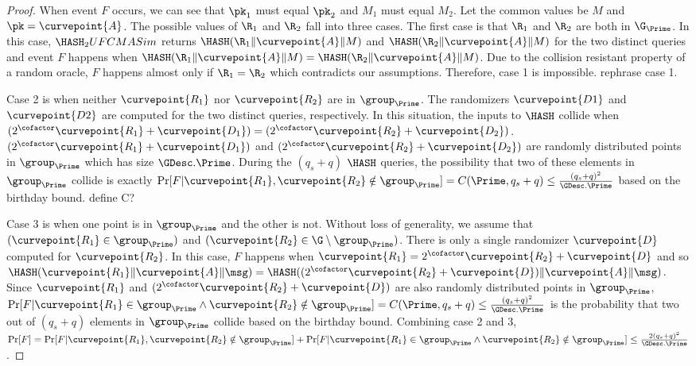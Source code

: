 \begin{proof}
	When event $F$ occurs, we can see that $\pk_1$ must equal $\pk_2$ and $M_1$ must equal $M_2$. Let the common values be $M$ and $\pk=\curvepoint{A}$. The possible values of $\R_1$ and $\R_2$ fall into three cases. The first case is that $\R_1$ and $\R_2$ are both in $\G_\Prime$. In this case, $\HASH_2UFCMASim$ returns $\HASH(\R_1\|\curvepoint{A}\|M)$ and $\HASH(\R_2\|\curvepoint{A}\|M)$ for the two distinct queries and event $F$ happens when $\HASH(\R_1\|\curvepoint{A}\|M) = \HASH(\R_2\|\curvepoint{A}\|M)$. Due to the collision resistant property of a random oracle, $F$ happens almost only if $\R_1 = \R_2$ which contradicts our assumptions. Therefore, case 1 is impossible. {\color{red} rephrase case 1.}
	
	Case 2 is when neither $\curvepoint{R_1}$ nor $\curvepoint{R_2}$ are  in $\group_{\Prime}$. The randomizers $\curvepoint{D1}$ and $\curvepoint{D2}$ are computed for the two distinct queries, respectively. In this situation, the inputs to $\HASH$ collide when $(2^\cofactor\curvepoint{R_1} + \curvepoint{D_1}) = (2^\cofactor\curvepoint{R_2} + \curvepoint{D_2})$. $(2^\cofactor\curvepoint{R_1} + \curvepoint{D_1})$ and $(2^\cofactor\curvepoint{R_2} + \curvepoint{D_2})$ are randomly distributed points in $\group_{\Prime}$ which has size $\GDesc.\Prime$. During the $(q_s + q)$ $\HASH$ queries, the possibility that two of these elements in $\group_{\Prime}$ collide is exactly $\Pr[F | \curvepoint{R_1}, \curvepoint{R_2} \notin \group_{\Prime}] = C(\Prime, q_s + q) \leq \frac{(q_s + q)^2}{\GDesc.\Prime}$ based on the birthday bound. 	{\color{red} define C?}
	
	
	Case 3 is when one point is in $\group_{\Prime}$ and the other is not. Without loss of generality, we assume that $(\curvepoint{R_1} \in \group_{\Prime})$ and $(\curvepoint{R_2} \in \G \setminus \group_{\Prime})$. There is only a single randomizer $\curvepoint{D}$ computed for $\curvepoint{R_2}$. In this case, $F$ happens when $\curvepoint{R_1} = 2^\cofactor \curvepoint{R_2} + \curvepoint{D}$ and so $\HASH(\curvepoint{R_1}\|\curvepoint{A}\| \msg) =  \HASH((2^\cofactor\curvepoint{R_2} + \curvepoint{D}) \|\curvepoint{A}\| \msg)$. Since $\curvepoint{R_1}$ and $(2^\cofactor\curvepoint{R_2} + \curvepoint{D})$ are also randomly distributed points in $\group_{\Prime}$, $\Pr[F | \curvepoint{R_1} \in \group_{\Prime} \wedge \curvepoint{R_2} \notin \group_{\Prime}] = C(\Prime, q_s + q) \leq \frac{(q_s + q)^2}{\GDesc.\Prime}$ is the probability that two out of $(q_s + q)$ elements in $\group_{\Prime}$ collide based on the birthday bound. Combining case 2 and 3, $\Pr[F] = \Pr[F | \curvepoint{R_1}, \curvepoint{R_2} \notin \group_{\Prime}] + \Pr[F | \curvepoint{R_1} \in \group_{\Prime} \wedge \curvepoint{R_2} \notin \group_{\Prime}] \leq \frac{2(q_s + q)^2}{\GDesc.\Prime}$.
	

\end{proof}
